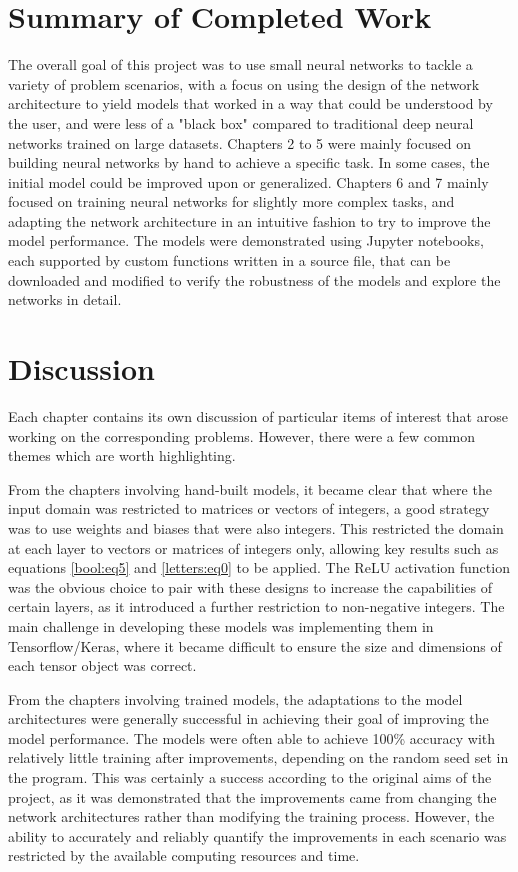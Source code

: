 \documentclass{somasmsc}
\begin{document}
\section{Summary of Completed Work}

The overall goal of this project was to use small neural networks to tackle a variety of problem scenarios, with a focus on using the design of the network architecture to yield models that worked in a way that could be understood by the user, and were less of a "black box" compared to traditional deep neural networks trained on large datasets. Chapters 2 to 5 were mainly focused on building neural networks by hand to achieve a specific task. In some cases, the initial model could be improved upon or generalized. Chapters 6 and 7 mainly focused on training neural networks for slightly more complex tasks, and adapting the network architecture in an intuitive fashion to try to improve the model performance. The models were demonstrated using Jupyter notebooks, each supported by custom functions written in a source file, that can be downloaded and modified to verify the robustness of the models and explore the networks in detail.

\section{Discussion}

Each chapter contains its own discussion of particular items of interest that arose working on the corresponding problems. However, there were a few common themes which are worth highlighting.

From the chapters involving hand-built models, it became clear that where the input domain was restricted to matrices or vectors of integers, a good strategy was to use weights and biases that were also integers. This restricted the domain at each layer to vectors or matrices of integers only, allowing key results such as equations \ref{bool:eq5} and \ref{letters:eq0} to be applied. The ReLU activation function was the obvious choice to pair with these designs to increase the capabilities of certain layers, as it introduced a further restriction to non-negative integers. The main challenge in developing these models was implementing them in Tensorflow/Keras, where it became difficult to ensure the size and dimensions of each tensor object was correct.

From the chapters involving trained models, the adaptations to the model architectures were generally successful in achieving their goal of improving the model performance. The models were often able to achieve 100\% accuracy with relatively little training after improvements, depending on the random seed set in the program. This was certainly a success according to the original aims of the project, as it was demonstrated that the improvements came from changing the network architectures rather than modifying the training process. However, the ability to accurately and reliably quantify the improvements in each scenario was restricted by the available computing resources and time.
\end{document}
